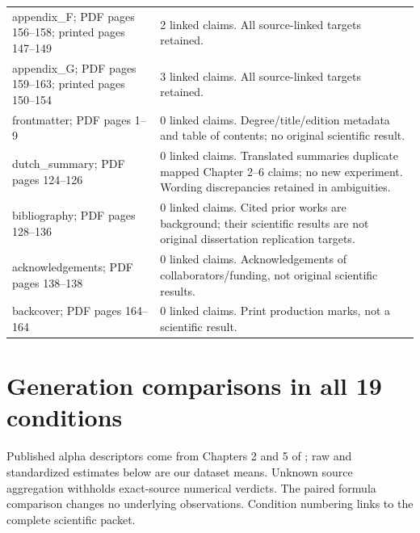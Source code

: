 \documentclass[11pt]{article}
\begin{document}
\begin{longtable}{p{105pt}p{335pt}}
appendix\_F; PDF pages 156--158; printed pages 147--149 & 2 linked claims. All source-linked targets retained.\\
appendix\_G; PDF pages 159--163; printed pages 150--154 & 3 linked claims. All source-linked targets retained.\\
frontmatter; PDF pages 1--9 & 0 linked claims. Degree/title/edition metadata and table of contents; no original scientific result.\\
dutch\_summary; PDF pages 124--126 & 0 linked claims. Translated summaries duplicate mapped Chapter 2--6 claims; no new experiment. Wording discrepancies retained in ambiguities.\\
bibliography; PDF pages 128--136 & 0 linked claims. Cited prior works are background; their scientific results are not original dissertation replication targets.\\
acknowledgements; PDF pages 138--138 & 0 linked claims. Acknowledgements of collaborators/funding, not original scientific results.\\
backcover; PDF pages 164--164 & 0 linked claims. Print production marks, not a scientific result.\\
\bottomrule\end{longtable}\section{Generation comparisons in all 19 conditions}
Published alpha descriptors come from Chapters 2 and 5 of \citet{schwabe2016}; raw and standardized estimates below are our dataset means. Unknown source aggregation withholds exact-source numerical verdicts. The paired formula comparison changes no underlying observations. Condition numbering links to the complete scientific packet.
\end{document}
